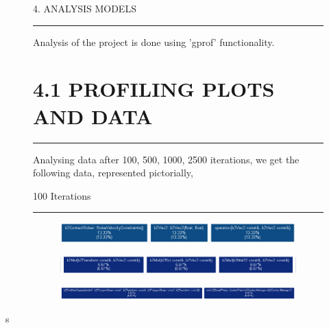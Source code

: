 \documentclass{report}
\begin{document}
\begin{figure}[b]
\huge 4. ANALYSIS MODELS \\
\hrule \large
Analysis of the project is done using 'gprof' \cite{gprof} functionality. 
\section*{4.1 PROFILING PLOTS AND DATA \\}
\hrule
\large Analysing data after 100, 500, 1000, 2500 iterations, we get the following data, represented pictorially,

\Large \begin{center}100 Iterations \hrule \end{center}
\begin{subfigure}[h]{\textwidth}
\includegraphics[width=\textwidth, height=0.1\textwidth]{gprof/100_1.png}
\caption{}
\end{subfigure}
\begin{subfigure}[h]{\textwidth}
\includegraphics[width=\textwidth, height=0.1\textwidth]{gprof/100_2.png}
\caption{}
\end{subfigure}
\begin{subfigure}[h]{\textwidth}
\includegraphics[width=\textwidth, height=0.1\textwidth]{gprof/100_3.png}
\caption{}
\end{subfigure}
\end{figure}s
\end{document}
